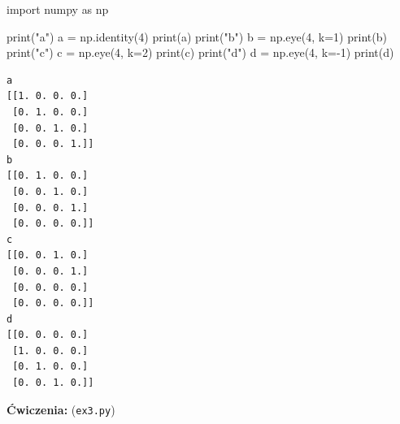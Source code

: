 \documentclass[
  letterpaper,
  DIV=11,
  numbers=noendperiod]{scrreprt}
\newenvironment{Shaded}{\begin{snugshade}}{\end{snugshade}}
\newcommand{\BuiltInTok}[1]{\textcolor[rgb]{0.00,0.23,0.31}{#1}}
\newcommand{\DecValTok}[1]{\textcolor[rgb]{0.68,0.00,0.00}{#1}}
\newcommand{\ImportTok}[1]{\textcolor[rgb]{0.00,0.46,0.62}{#1}}
\newcommand{\NormalTok}[1]{\textcolor[rgb]{0.00,0.23,0.31}{#1}}
\newcommand{\OperatorTok}[1]{\textcolor[rgb]{0.37,0.37,0.37}{#1}}
\newcommand{\StringTok}[1]{\textcolor[rgb]{0.13,0.47,0.30}{#1}}
\begin{document}
\begin{Shaded}
\begin{Highlighting}[]
\ImportTok{import}\NormalTok{ numpy }\ImportTok{as}\NormalTok{ np}

\BuiltInTok{print}\NormalTok{(}\StringTok{"a"}\NormalTok{)}
\NormalTok{a }\OperatorTok{=}\NormalTok{ np.identity(}\DecValTok{4}\NormalTok{)}
\BuiltInTok{print}\NormalTok{(a)}
\BuiltInTok{print}\NormalTok{(}\StringTok{"b"}\NormalTok{)}
\NormalTok{b }\OperatorTok{=}\NormalTok{ np.eye(}\DecValTok{4}\NormalTok{, k}\OperatorTok{=}\DecValTok{1}\NormalTok{)}
\BuiltInTok{print}\NormalTok{(b)}
\BuiltInTok{print}\NormalTok{(}\StringTok{"c"}\NormalTok{)}
\NormalTok{c }\OperatorTok{=}\NormalTok{ np.eye(}\DecValTok{4}\NormalTok{, k}\OperatorTok{=}\DecValTok{2}\NormalTok{)}
\BuiltInTok{print}\NormalTok{(c)}
\BuiltInTok{print}\NormalTok{(}\StringTok{"d"}\NormalTok{)}
\NormalTok{d }\OperatorTok{=}\NormalTok{ np.eye(}\DecValTok{4}\NormalTok{, k}\OperatorTok{={-}}\DecValTok{1}\NormalTok{)}
\BuiltInTok{print}\NormalTok{(d)}
\end{Highlighting}
\end{Shaded}

\begin{verbatim}
a
[[1. 0. 0. 0.]
 [0. 1. 0. 0.]
 [0. 0. 1. 0.]
 [0. 0. 0. 1.]]
b
[[0. 1. 0. 0.]
 [0. 0. 1. 0.]
 [0. 0. 0. 1.]
 [0. 0. 0. 0.]]
c
[[0. 0. 1. 0.]
 [0. 0. 0. 1.]
 [0. 0. 0. 0.]
 [0. 0. 0. 0.]]
d
[[0. 0. 0. 0.]
 [1. 0. 0. 0.]
 [0. 1. 0. 0.]
 [0. 0. 1. 0.]]
\end{verbatim}

\textbf{Ćwiczenia:} (\texttt{ex3.py})
\end{document}

